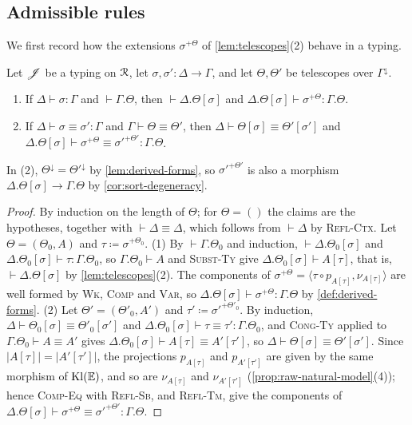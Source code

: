 \subsection{Admissible rules}
\label{sec:tos-admissible}

We first record how the extensions $\sigma^{+\Theta}$ of \cref{lem:telescopes}(2) behave in a typing.

\begin{lemma}\label{lem:lifting}
    Let $\mathscr{J}$ be a typing on $\mathcal{R}$, let $\sigma, \sigma' : \Delta \to \Gamma$, and let $\Theta, \Theta'$ be telescopes over $\Gamma^{\downarrow}$.
    \begin{enumerate}
        \item If $\Delta \vdash \sigma : \Gamma$ and $\vdash \Gamma.\Theta$, then $\vdash \Delta.\Theta[\sigma]$ and $\Delta.\Theta[\sigma] \vdash \sigma^{+\Theta} : \Gamma.\Theta$.
        \item If $\Delta \vdash \sigma \equiv \sigma' : \Gamma$ and $\Gamma \vdash \Theta \equiv \Theta'$, then $\Delta \vdash \Theta[\sigma] \equiv \Theta'[\sigma']$ and $\Delta.\Theta[\sigma] \vdash \sigma^{+\Theta} \equiv \sigma'^{+\Theta'} : \Gamma.\Theta$.
    \end{enumerate}
    In (2), $\Theta^{\downarrow} = \Theta'^{\downarrow}$ by \cref{lem:derived-forms}, so $\sigma'^{+\Theta'}$ is also a morphism $\Delta.\Theta[\sigma] \to \Gamma.\Theta$ by \cref{cor:sort-degeneracy}.
\end{lemma}

\begin{proof}
    By induction on the length of $\Theta$; for $\Theta = ()$ the claims are the hypotheses, together with $\vdash \Delta \equiv \Delta$, which follows from $\vdash \Delta$ by \textsc{Refl-Ctx}. Let $\Theta = (\Theta_0, A)$ and $\tau \coloneqq \sigma^{+\Theta_0}$. (1) By $\vdash \Gamma.\Theta_0$ and induction, $\vdash \Delta.\Theta_0[\sigma]$ and $\Delta.\Theta_0[\sigma] \vdash \tau : \Gamma.\Theta_0$, so $\Gamma.\Theta_0 \vdash A$ and \textsc{Subst-Ty} give $\Delta.\Theta_0[\sigma] \vdash A[\tau]$, that is, $\vdash \Delta.\Theta[\sigma]$ by \cref{lem:telescopes}(2). The components of $\sigma^{+\Theta} = \langle \tau \circ p_{A[\tau]}, \nu_{A[\tau]} \rangle$ are well formed by \textsc{Wk}, \textsc{Comp} and \textsc{Var}, so $\Delta.\Theta[\sigma] \vdash \sigma^{+\Theta} : \Gamma.\Theta$ by \cref{def:derived-forms}. (2) Let $\Theta' = (\Theta'_0, A')$ and $\tau' \coloneqq \sigma'^{+\Theta'_0}$. By induction, $\Delta \vdash \Theta_0[\sigma] \equiv \Theta'_0[\sigma']$ and $\Delta.\Theta_0[\sigma] \vdash \tau \equiv \tau' : \Gamma.\Theta_0$, and \textsc{Cong-Ty} applied to $\Gamma.\Theta_0 \vdash A \equiv A'$ gives $\Delta.\Theta_0[\sigma] \vdash A[\tau] \equiv A'[\tau']$, so $\Delta \vdash \Theta[\sigma] \equiv \Theta'[\sigma']$. Since $|A[\tau]| = |A'[\tau']|$, the projections $p_{A[\tau]}$ and $p_{A'[\tau']}$ are given by the same morphism of $\mathrm{Kl}(\mathbb{E})$, and so are $\nu_{A[\tau]}$ and $\nu_{A'[\tau']}$ (\cref{prop:raw-natural-model}(4)); hence \textsc{Comp-Eq} with \textsc{Refl-Sb}, and \textsc{Refl-Tm}, give the components of $\Delta.\Theta[\sigma] \vdash \sigma^{+\Theta} \equiv \sigma'^{+\Theta'} : \Gamma.\Theta$.
\end{proof}

